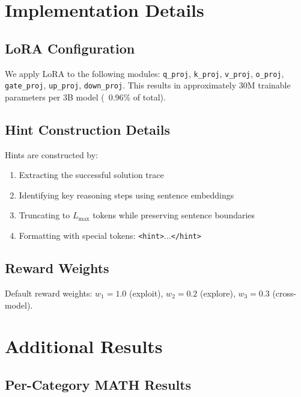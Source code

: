 \documentclass[11pt]{article}
\begin{document}


\appendix

\section{Implementation Details}
\label{sec:appendix_implementation}

\subsection{LoRA Configuration}
We apply LoRA to the following modules: \texttt{q\_proj}, \texttt{k\_proj}, \texttt{v\_proj}, \texttt{o\_proj}, \texttt{gate\_proj}, \texttt{up\_proj}, \texttt{down\_proj}. This results in approximately 30M trainable parameters per 3B model (~0.96\% of total).

\subsection{Hint Construction Details}
Hints are constructed by:
\begin{enumerate}
    \item Extracting the successful solution trace
    \item Identifying key reasoning steps using sentence embeddings
    \item Truncating to $L_{\max}$ tokens while preserving sentence boundaries
    \item Formatting with special tokens: \texttt{<hint>}...\texttt{</hint>}
\end{enumerate}

\subsection{Reward Weights}
Default reward weights: $w_1 = 1.0$ (exploit), $w_2 = 0.2$ (explore), $w_3 = 0.3$ (cross-model).

\section{Additional Results}
\label{sec:appendix_results}

\subsection{Per-Category MATH Results}
\end{document}
